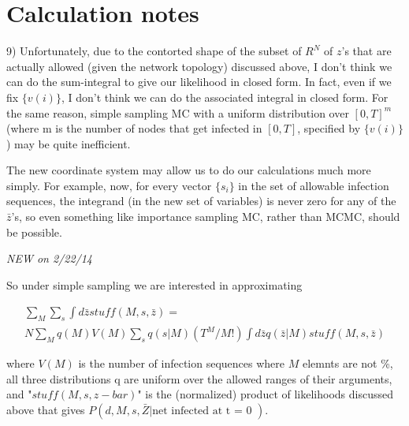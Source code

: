 \documentclass{article}
\begin{document}
\section{Calculation notes}

        9) Unfortunately, due to the contorted shape of the subset of
        $R^N$ of $z$'s that are actually allowed (given the network topology)
        discussed above, I don't think we can do the sum-integral to give our
        likelihood in closed form. In fact, even if we fix $\{v(i)\}$, I don't
        think we can do the associated integral in closed form. For the same
        reason, simple sampling MC with a uniform distribution over $[0, T]^m$
        (where m is the number of nodes that get infected in $[0, T]$, specified
        by $\{v(i)\}$) may be quite inefficient.


        The new coordinate system may allow us to do our calculations much more simply. For
        example, now, for every vector $\{s_i\}$ in the set of allowable infection sequences, the 
        integrand (in the new set of variables) is never zero for any of the
        $\bar{z}$'s,  so even something like importance sampling MC, rather than 
        MCMC, should be possible. 

        \emph{NEW on 2/22/14}

        So under simple sampling we are interested in approximating

\begin{align}
\sum_{M}  \sum_{s} \int d\bar{z} stuff(M, s, \bar{z}) =\\
N \sum_M q(M)  V(M) \sum_{s} q(s | M)   (T^M/M!)  \int d\bar{z} q(\bar{z} | M) stuff(M, s, \bar{z}) \label{draw}
\end{align}

        where $V(M)$ is the number of infection sequences where  $M$ elemnts are not \%, 
        all three distributions q are uniform over the allowed ranges of their arguments, and 
        "$stuff(M, s, z-bar)$" is the
        (normalized) product of likelihoods discussed above that gives
        $P(d, M, s, \bar{Z} | \text{net infected at t  = 0 })$.
\end{document}
